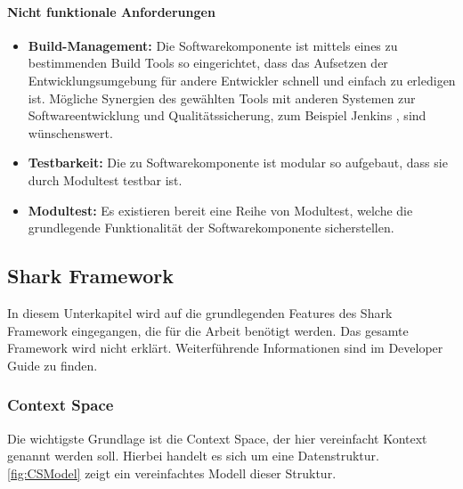 \documentclass[a4paper]{article}
\begin{document}
	\paragraph{Nicht funktionale Anforderungen}
	\begin{itemize}
		\item \textbf{Build-Management:} Die Softwarekomponente ist mittels
		eines zu bestimmenden Build Tools so eingerichtet, dass das Aufsetzen 
		der	Entwicklungsumgebung für andere Entwickler schnell und einfach
		zu erledigen ist. Mögliche Synergien des gewählten Tools mit anderen
		Systemen zur Softwareentwicklung und Qualitätssicherung, zum Beispiel  
		Jenkins \cite{Jenkins}, sind wünschenswert.
		\item \textbf{Testbarkeit:} Die zu Softwarekomponente
		ist modular so aufgebaut, dass sie durch Modultest testbar ist.
		\item \textbf{Modultest:} Es existieren bereit eine Reihe von
		Modultest, welche die grundlegende Funktionalität der 
		Softwarekomponente sicherstellen.
	\end{itemize} 
	
	\subsection{Shark Framework}
	
	In diesem Unterkapitel wird auf die grundlegenden Features des Shark
	Framework \cite{SharkFW} eingegangen, die für die Arbeit benötigt werden. 	
	Das gesamte	Framework wird nicht erklärt. Weiterführende Informationen sind
	im Developer Guide \cite{SharkManual} zu finden.
	
	\subsubsection{Context Space} 
	\label{sec:CS}
	
	Die wichtigste Grundlage ist die Context Space, der hier vereinfacht Kontext
	genannt werden soll. Hierbei handelt es sich um eine Datenstruktur.
	\autoref{fig:CSModel} zeigt ein vereinfachtes Modell dieser Struktur.
	
\end{document}
